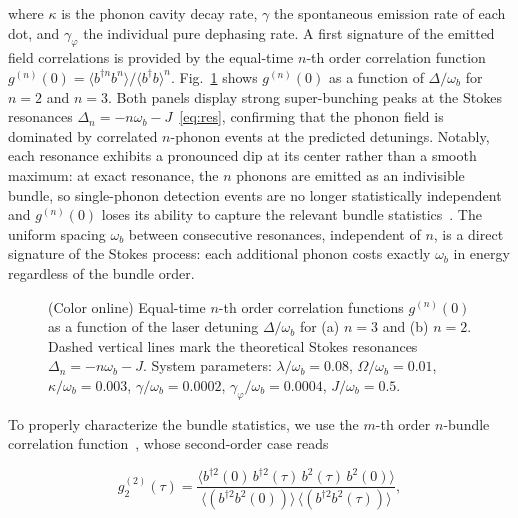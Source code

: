 \documentclass{ws-ijmpb}
\begin{document}
where $\kappa$ is the phonon cavity decay rate, $\gamma$ the spontaneous emission rate of each 
dot, and $\gamma_\varphi$ the individual pure dephasing rate. A first signature of the emitted 
field correlations is provided by the equal-time $n$-th order correlation function ~\cite{glauber1963}
$g^{(n)}(0) = \langle b^{\dagger n}b^n\rangle/\langle b^\dagger b\rangle^n$. 
Fig.~\ref{fig:gn} shows $g^{(n)}(0)$ as a function of $\Delta/\omega_b$ for $n = 2$ and $n = 3$. 
Both panels display strong super-bunching peaks at the Stokes resonances 
$\Delta_n = -n\omega_b - J$~\eqref{eq:res}, confirming that the phonon field is dominated by 
correlated $n$-phonon events at the predicted detunings. Notably, each resonance exhibits a 
pronounced dip at its center rather than a smooth maximum: at exact resonance, the $n$ phonons 
are emitted as an indivisible bundle, so single-phonon detection events are no longer 
statistically independent and $g^{(n)}(0)$ loses its ability to capture the relevant bundle 
statistics~\cite{munoz2014}. The uniform spacing $\omega_b$ between consecutive resonances, 
independent of $n$, is a direct signature of the Stokes process: each additional phonon costs 
exactly $\omega_b$ in energy regardless of the bundle order.

\begin{figure}[H]
	\centering
	\caption{(Color online) Equal-time $n$-th order correlation functions $g^{(n)}(0)$ as a function of the laser 
		detuning $\Delta/\omega_b$ for (a) $n = 3$ and (b) $n = 2$. Dashed vertical lines mark the 
		theoretical Stokes resonances $\Delta_n = -n\omega_b - J$. System parameters: 
		$\lambda/\omega_b = 0.08$, $\Omega/\omega_b = 0.01$, $\kappa/\omega_b = 0.003$, 
		$\gamma/\omega_b = 0.0002$, $\gamma_\varphi/\omega_b = 0.0004$, $J/\omega_b = 0.5$.}
	\label{fig:gn}
\end{figure}

To properly characterize the bundle statistics, we use the $m$-th order $n$-bundle correlation 
function~\cite{munoz2014}, whose second-order case reads

\begin{equation}
	g_2^{(2)}(\tau) = \frac{\langle b^{\dagger 2}(0)\,b^{\dagger 2}(\tau)\,
		b^2(\tau)\,b^2(0)\rangle}
	{\langle (b^{\dagger 2}b^2 (0))\rangle\,\langle (b^{\dagger 2}b^2(\tau))\rangle},
	\label{eq:g2bundle}
\end{equation}
\end{document}
